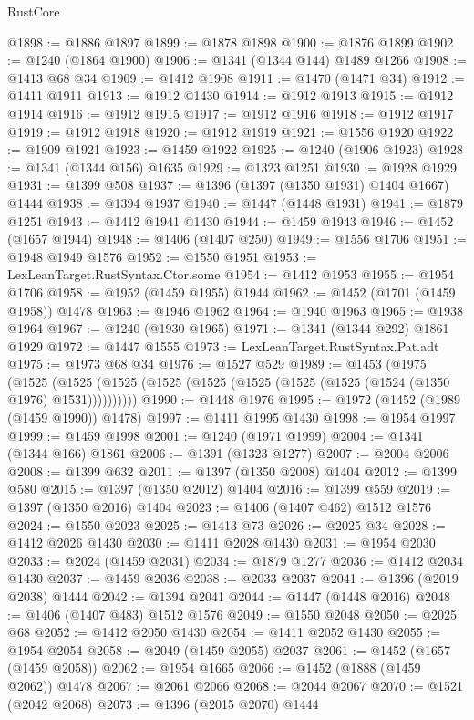 \begin{lexlean}{RustCore}
\begin{coremodule}
@1898 := @1886 @1897
@1899 := @1878 @1898
@1900 := @1876 @1899
@1902 := @1240 (@1864 @1900)
@1906 := @1341 (@1344 @144) @1489 @1266
@1908 := @1413 @68 @34
@1909 := @1412 @1908
@1911 := @1470 (@1471 @34)
@1912 := @1411 @1911
@1913 := @1912 @1430
@1914 := @1912 @1913
@1915 := @1912 @1914
@1916 := @1912 @1915
@1917 := @1912 @1916
@1918 := @1912 @1917
@1919 := @1912 @1918
@1920 := @1912 @1919
@1921 := @1556 @1920
@1922 := @1909 @1921
@1923 := @1459 @1922
@1925 := @1240 (@1906 @1923)
@1928 := @1341 (@1344 @156) @1635
@1929 := @1323 @1251
@1930 := @1928 @1929
@1931 := @1399 @508
@1937 := @1396 (@1397 (@1350 @1931) @1404 @1667) @1444
@1938 := @1394 @1937
@1940 := @1447 (@1448 @1931)
@1941 := @1879 @1251
@1943 := @1412 @1941 @1430
@1944 := @1459 @1943
@1946 := @1452 (@1657 @1944)
@1948 := @1406 (@1407 @250)
@1949 := @1556 @1706
@1951 := @1948 @1949 @1576
@1952 := @1550 @1951
@1953 := LexLeanTarget.RustSyntax.Ctor.some
@1954 := @1412 @1953
@1955 := @1954 @1706
@1958 := @1952 (@1459 @1955) @1944
@1962 := @1452 (@1701 (@1459 @1958)) @1478
@1963 := @1946 @1962
@1964 := @1940 @1963
@1965 := @1938 @1964
@1967 := @1240 (@1930 @1965)
@1971 := @1341 (@1344 @292) @1861 @1929
@1972 := @1447 @1555
@1973 := LexLeanTarget.RustSyntax.Pat.adt
@1975 := @1973 @68 @34
@1976 := @1527 @529
@1989 := @1453
    (@1975
      (@1525 (@1525 (@1525 (@1525 (@1525 (@1525 (@1525 (@1525 (@1524 (@1350 @1976) @1531))))))))))
@1990 := @1448 @1976
@1995 := @1972 (@1452 (@1989 (@1459 @1990)) @1478)
@1997 := @1411 @1995 @1430
@1998 := @1954 @1997
@1999 := @1459 @1998
@2001 := @1240 (@1971 @1999)
@2004 := @1341 (@1344 @166) @1861
@2006 := @1391 (@1323 @1277)
@2007 := @2004 @2006
@2008 := @1399 @632
@2011 := @1397 (@1350 @2008) @1404
@2012 := @1399 @580
@2015 := @1397 (@1350 @2012) @1404
@2016 := @1399 @559
@2019 := @1397 (@1350 @2016) @1404
@2023 := @1406 (@1407 @462) @1512 @1576
@2024 := @1550 @2023
@2025 := @1413 @73
@2026 := @2025 @34
@2028 := @1412 @2026 @1430
@2030 := @1411 @2028 @1430
@2031 := @1954 @2030
@2033 := @2024 (@1459 @2031)
@2034 := @1879 @1277
@2036 := @1412 @2034 @1430
@2037 := @1459 @2036
@2038 := @2033 @2037
@2041 := @1396 (@2019 @2038) @1444
@2042 := @1394 @2041
@2044 := @1447 (@1448 @2016)
@2048 := @1406 (@1407 @483) @1512 @1576
@2049 := @1550 @2048
@2050 := @2025 @68
@2052 := @1412 @2050 @1430
@2054 := @1411 @2052 @1430
@2055 := @1954 @2054
@2058 := @2049 (@1459 @2055) @2037
@2061 := @1452 (@1657 (@1459 @2058))
@2062 := @1954 @1665
@2066 := @1452 (@1888 (@1459 @2062)) @1478
@2067 := @2061 @2066
@2068 := @2044 @2067
@2070 := @1521 (@2042 @2068)
@2073 := @1396 (@2015 @2070) @1444

\end{coremodule}
\end{lexlean}
